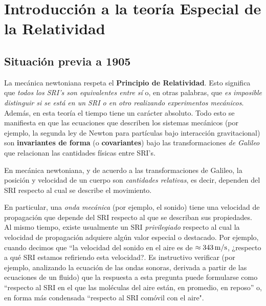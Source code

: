\chapter{Introducción a la teoría Especial de la Relatividad}

\section{Situación previa a 1905}

La mecánica newtoniana respeta el \textbf{Principio de Relatividad}. Esto significa que \textit{todos los SRI's son equivalentes entre sí} o, en otras palabras, que \textit{es imposible distinguir si se está en un SRI o en otro realizando experimentos mecánicos}. Además, en esta teoría el tiempo tiene un carácter absoluto. Todo esto se manifiesta en que las ecuaciones que describen los sistemas mecánicos (por ejemplo, la segunda ley de Newton para partículas bajo interacción gravitacional) son \textbf{invariantes de forma} (o \textbf{covariantes}) bajo las transformaciones \textit{de Galileo} que relacionan las cantidades físicas entre SRI's.

En mecánica newtoniana, y de acuerdo a las transformaciones de Galileo, la
posición y velocidad de un cuerpo  son \textit{cantidades relativas}, es decir, dependen del SRI respecto al cual se describe el movimiento.

En particular, una \textit{onda mecánica} (por ejemplo, el sonido) tiene una velocidad de propagación que depende del SRI respecto al que se describan sus propiedades. Al mismo tiempo, existe usualmente un SRI \textit{privilegiado} respecto al cual la velocidad de propagación adquiere algún valor especial o destacado.
Por ejemplo, cuando decimos que ``la velocidad del sonido en el aire es de $\approx 343\,\rm m/s$, ¿respecto a qué SRI estamos refiriendo esta velocidad?. Es instructivo verificar (por ejemplo, analizando la ecuación de las ondas sonoras, derivada a partir de las ecuaciones de un fluido) que la respuesta a esta pregunta puede formularse como ``respecto al SRI en el que las moléculas del aire están, en promedio, en reposo'' o, en forma más condensada ``respecto al SRI comóvil con el aire".

